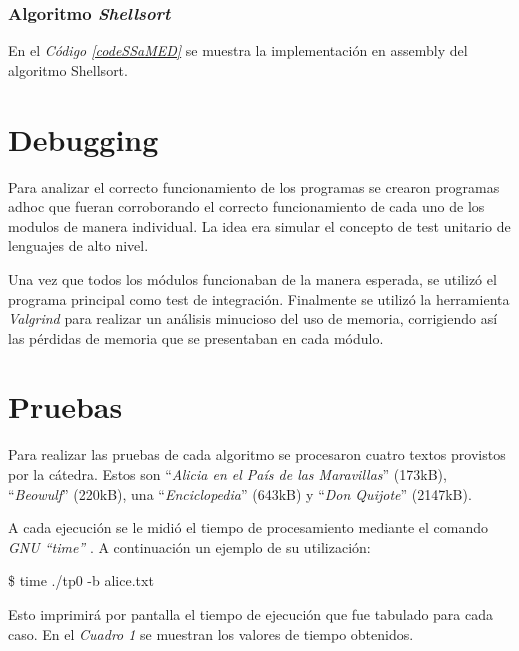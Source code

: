 \documentclass{article}
\newcommand{\refcode}[1]{\textit{Código \ref{#1}}}
\begin{document}
\subsubsection{Algoritmo \textit{Shellsort}}

	En el \refcode{codeSSaMED} se muestra la implementación en assembly del algoritmo Shellsort.

%  




\section{Debugging}
	
	Para analizar el correcto funcionamiento de los programas se crearon programas adhoc que fueran corroborando el correcto funcionamiento de cada uno de los modulos de manera individual. La idea era simular el concepto de test unitario de lenguajes de alto nivel.
	\par
	Una vez que todos los módulos funcionaban de la manera esperada, se utilizó el programa principal como test de integración.
Finalmente se utilizó la herramienta \textit{Valgrind} para realizar un análisis minucioso del uso de memoria, corrigiendo así las pérdidas de memoria que se presentaban en cada módulo.
\bigskip




\section{Pruebas}

	Para realizar las pruebas de cada algoritmo se procesaron cuatro textos provistos por la cátedra. Estos son ``\textit{Alicia en el País de las Maravillas}'' (173kB), ``\textit{Beowulf}'' (220kB), una ``\textit{Enciclopedia}'' (643kB) y ``\textit{Don Quijote}'' (2147kB).
	\par
	A cada ejecución se le midió el tiempo de procesamiento mediante el comando \textit{GNU ``time''} \cite{TIME}. A continuación un ejemplo de su utilización:
\bigskip

{\ttfamily\footnotesize
\indent \$ time ./tp0 -b alice.txt\\}


\noindent Esto imprimirá por pantalla el tiempo de ejecución que fue tabulado para cada caso. En el \textit{Cuadro 1} se muestran los valores de tiempo obtenidos.
\bigskip\bigskip
\end{document}

